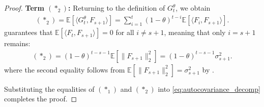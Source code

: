\documentclass[10pt,a4paper]{amsart}
\newcommand{\E}{\mathbb E}
\begin{document}
\begin{proof}
\vspace{5pt}
\noindent
\textbf{Term $(*_2)$:}
Returning to the definition of $G_t^\theta$, we obtain
\begin{align}
    (*_2) = \E\left[ \langle G_t^\theta, F_{s+1} \rangle \right] = \sum_{i=1}^{t} (1-\theta)^{t-i} \E\left[ \langle F_i, F_{s+1} \rangle \right] .
\end{align}
 guarantees that $\E\left[ \langle F_t, F_{s+1} \rangle \right] = 0$ for all $i \ne s + 1$, meaning that only $i = s + 1$ remains:
\begin{align}
    (*_2) = (1 - \theta)^{t-s-1} \E\left[ \| F_{s+1} \|_2^2 \right] = (1 - \theta)^{t-s-1} \sigma_{s+1}^2 .
\end{align}
where the second equality follows from $\E[ \| F_{s+1} \|_2^2 ] = \sigma_{s+1}^2$ by .

\vspace{5pt}
\noindent
Substituting the equalities of $(*_1)$ and $(*_2)$ into \eqref{eq:autocovariance_decomp} completes the proof.
\end{proof}
\end{document}
